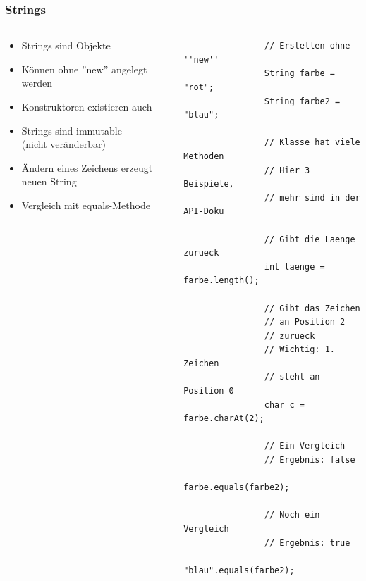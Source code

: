 \begin{frame}[fragile]
	  \frametitle{Strings}
		 \begin{columns}
		 \begin{column}{0.5\textwidth}
			  \small
			  \begin{itemize}
			    \item Strings sind Objekte
			    \item K\"onnen ohne ''new'' angelegt werden
			    \item Konstruktoren existieren auch
			    \item Strings sind immutable\\
			    (nicht ver\"anderbar)
			    \item \"Andern eines Zeichens erzeugt neuen
			    String
			    \item Vergleich mit equals-Methode
			  \end{itemize}
		 \end{column}
		 \begin{column}{0.5\textwidth}
		 	\begin{lstlisting}
		 		// Erstellen ohne ''new''
		 		String farbe = "rot";
		 		String farbe2 = "blau";
		 		
    			// Klasse hat viele Methoden
    			// Hier 3 Beispiele,
    			// mehr sind in der API-Doku

		 		// Gibt die Laenge zurueck
		 		int laenge = farbe.length();
		 		
		 		// Gibt das Zeichen 
		 		// an Position 2
		 		// zurueck
		 		// Wichtig: 1. Zeichen
		 		// steht an Position 0
		 		char c = farbe.charAt(2);
		 		
		 		// Ein Vergleich
		 		// Ergebnis: false
		 		farbe.equals(farbe2);
		 		
		 		// Noch ein Vergleich
		 		// Ergebnis: true
		 		"blau".equals(farbe2);
		 	\end{lstlisting}
		 \end{column}
		 \end{columns}
\end{frame}

